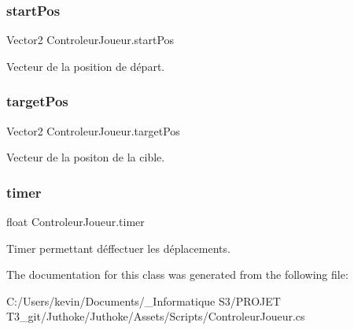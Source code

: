 \subsubsection{\texorpdfstring{start\+Pos}{startPos}}
{\footnotesize\ttfamily Vector2 Controleur\+Joueur.\+start\+Pos\hspace{0.3cm}{\ttfamily [private]}}

Vecteur de la position de départ. \mbox{\label{class_controleur_joueur_aa64173e4c604d9e2d6a646a7cff95a35}} 
\subsubsection{\texorpdfstring{target\+Pos}{targetPos}}
{\footnotesize\ttfamily Vector2 Controleur\+Joueur.\+target\+Pos\hspace{0.3cm}{\ttfamily [private]}}

Vecteur de la positon de la cible. \mbox{\label{class_controleur_joueur_aca7166f5bec51b3af5982dbafe681305}} 
\subsubsection{\texorpdfstring{timer}{timer}}
{\footnotesize\ttfamily float Controleur\+Joueur.\+timer\hspace{0.3cm}{\ttfamily [private]}}

Timer permettant d\textquotesingle{}éffectuer les déplacements. 

The documentation for this class was generated from the following file\+:\begin{DoxyCompactItemize}
\item 
C\+:/\+Users/kevin/\+Documents/\+\_\+\+Informatique S3/\+P\+R\+O\+J\+E\+T T3\+\_\+git/\+Juthoke/\+Juthoke/\+Assets/\+Scripts/Controleur\+Joueur.\+cs\end{DoxyCompactItemize}
